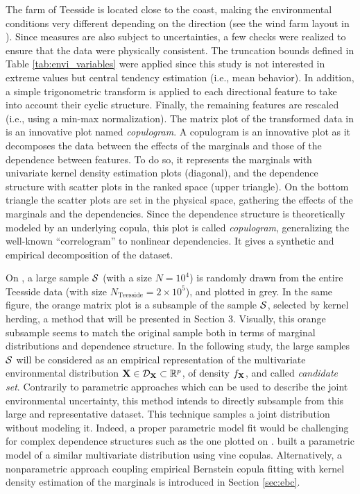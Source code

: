 The farm of Teesside is located close to the coast, making the environmental conditions very different depending on the direction (see the wind farm layout in ). 
Since measures are also subject to uncertainties, a few checks were realized to ensure that the data were physically consistent. 
The truncation bounds defined in Table \ref{tab:envi_variables} were applied since this study is not interested in extreme values but central tendency estimation (i.e., mean behavior). 
In addition, a simple trigonometric transform is applied to each directional feature to take into account their cyclic structure. 
Finally, the remaining features are rescaled (i.e., using a min-max normalization). 
The matrix plot of the transformed data in  is an innovative plot named \emph{copulogram}. 
A copulogram is an innovative plot as it decomposes the data between the effects of the marginals and those of the dependence between features. 
To do so, it represents the marginals with univariate kernel density estimation plots (diagonal), and the dependence structure with scatter plots in the ranked space (upper triangle). 
On the bottom triangle the scatter plots are set in the physical space, gathering the effects of the marginals and the dependencies. 
Since the dependence structure is theoretically modeled by an underlying copula, this plot is called \emph{copulogram}, generalizing the well-known ``correlogram'' to nonlinear dependencies. 
It gives a synthetic and empirical decomposition of the dataset.

On , a large sample $\mathcal{S}$ (with a size $N=10^4$) is randomly drawn from the entire Teesside data (with size $N_{\mathrm{Teesside}} = 2\times 10^5$), and plotted in grey. 
In the same figure, the orange matrix plot is a subsample of the sample $\mathcal{S}$, selected by kernel herding, a method that will be presented in Section 3. 
Visually, this orange subsample seems to match the original sample both in terms of marginal distributions and dependence structure. 
In the following study, the large samples $\mathcal{S}$ will be considered as an empirical representation of the multivariate environmental distribution ${\bf X} \in \mathcal{D}_{{\bf X}} \subset \mathbb{R}^p$, of density $f_{{\bf X}}$, and called \textit{candidate set}. 
Contrarily to parametric approaches which can be used to describe the joint environmental uncertainty, this method intends to directly subsample from this large and representative dataset. 
This technique samples a joint distribution without modeling it. Indeed, a proper parametric model fit would be challenging for complex dependence structures such as the one plotted on . 
\cite{li_zhan_2020} built a parametric model of a similar multivariate distribution using vine copulas. 
Alternatively, a nonparametric approach coupling empirical Bernstein copula fitting with kernel density estimation of the marginals is introduced in Section \ref{sec:ebc}.

